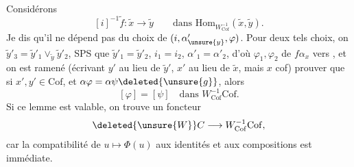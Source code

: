 Considérons 
\[
[i]^{-1}\tilde f:\tilde x\longrightarrow\tilde y\qquad\text{dans }\mathrm{Hom}_{W_{\mathrm{Cof}}^{-1}}(\tilde x,\tilde y).
\]
Je dis qu'il ne dépend pas du choix de $(i,\alpha'_{\unsure{y}},\varphi)$. Pour deux tels choix, on
 $\tilde y'_3=\tilde y'_1\vee_{\tilde y}\tilde y'_2$,
SPS que $\tilde y'_1=\tilde y'_2$, $i_1=i_2$, $\alpha'_1=\alpha'_2$, d'où  $\varphi_1,\varphi_2$ de $f\alpha_x$ vers ,  et on est ramené (écrivant $y'$ au lieu de $\tilde y'$, $x'$ au lieu de $\tilde x$, mais $x$ cof)
prouver que si $x',y'\in\mathrm{Cof}$, et $\alpha\varphi=\alpha\psi\deleted{\unsure{g}}$, alors
\[
[\varphi]=[\psi]\quad\text{dans } W_{\mathrm{Cof}}^{-1}\mathrm{Cof}.
\]
Si ce lemme est valable, on trouve un foncteur
\[
\deleted{\unsure{W}}C\longrightarrow W_{\mathrm{Cof}}^{-1}\mathrm{Cof},
\]
car la compatibilité de $u\mapsto\Phi(u)$ aux identités et aux compositions est immédiate.

